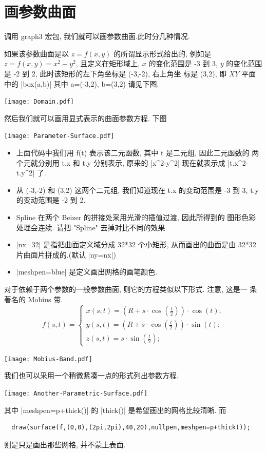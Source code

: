 \documentclass[nofonts,CJKnormalspaces]{ctexbook}[2009/05/20]
\begin{document}
\section{画参数曲面}
调用 graph3 宏包, 我们就可以画参数曲面.此时分几种情况.

如果该参数曲面是以 $z=f(x,y)$ 的所谓显示形式给出的, 例如是
$z=f(x,y)=x^2-y^2$, 且定义在矩形域上, $x$ 的变化范围是 -3 到 3,
$y$ 的变化范围是 -2 到 2, 此时该矩形的左下角坐标是 (-3,-2), 右上角坐
标是 (3,2), 即 $XY$ 平面中的 |box(a,b)| 其中 a=(-3,2), b=(3,2) 请见下图.
\begin{center}\texttt{[image: Domain.pdf]}\end{center}%

然后我们就可以画用显式表示的曲面参数方程. 下图
\begin{center}\texttt{[image: Parameter-Surface.pdf]}\end{center}%

\begin{itemize}
\item 上面代码中我们用 f(t) 表示该二元函数, 其中 t 是二元组, 因此二元函数的
  两个元就分别用 t.x 和 t.y 分别表示, 原来的 |x^2-y^2| 现在就表示成
  |t.x^2-t.y^2| 了.
\item 从 (-3,-2) 和 (3,2) 这两个二元组, 我们知道现在 t.x 的变动范围是
  -3 到 3, t.y 的变动范围是 -2 到 2.
\item Spline  在两个 Beizer 的拼接处采用光滑的插值过渡, 因此所得到的
  图形色彩处理会连续. 请把 "Spline" 去掉对比不同的效果.
\item |nx=32| 是指把曲面定义域分成 32*32 个小矩形, 从而画出的曲面是由
  32*32 片曲面片拼成的.(默认 |ny=nx|)
\item |meshpen=blue| 是定义画出网格的画笔颜色.
\end{itemize}
对于依赖于两个参数的一般参数曲面, 则它的方程类似以下形式. 注意, 这是一
条著名的 Mobius 带.
\begin{equation}
  f(s,t)=\left\{
    \begin{array}{ll}
      x(s,t)=(R+s\cdot\cos(\frac{t}{2}))\cdot\cos(t);\\
      y(s,t)=(R+s\cdot\cos(\frac{t}{2}))\cdot\sin(t);\\
      z(s,t)=s\cdot\sin(\frac{t}{2});
    \end{array}\right.
\end{equation}
\begin{center}\texttt{[image: Mobius-Band.pdf]}\end{center}%

我们也可以采用一个稍微紧凑一点的形式列出参数方程.
\begin{center}\texttt{[image: Another-Parametric-Surface.pdf]}\end{center}%

其中 |meshpen=p+thick()| 的 |thick()|  是希望画出的网格比较清晰.  而
\begin{lstlisting}
  draw(surface(f,(0,0),(2pi,2pi),40,20),nullpen,meshpen=p+thick());
\end{lstlisting}
则是只是画出那些网格, 并不蒙上表面.
\end{document}
